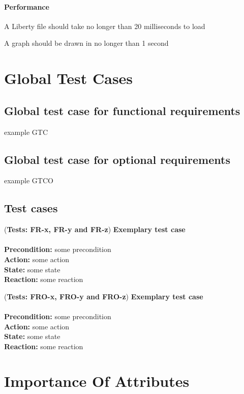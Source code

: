 \documentclass[10pt,a4paper]{report}
\newcommand{\precondition}[1]{
    \textbf{Precondition: } #1 \leavevmode \\
}
\newcommand{\action}[1]{
    \textbf{Action: } #1 \leavevmode \\
}
\newcommand{\state}[1]{
    \textbf{State: } #1 \leavevmode \\
}
\newcommand{\reaction}[1]{
    \textbf{Reaction: } #1 \leavevmode \\
}
\newcommand{\GTCDescription}[2]{
    (\textbf{Tests: #1}) \textbf{#2} \leavevmode \\
}
\newcommand{\GTCODescription}[2]{
    (\textbf{Tests: #1}) \textbf{#2} \leavevmode \\
}
\begin{document}
\subsubsection{Performance}
\begin{NFRO-Perf}
    \item A Liberty file should take no longer than 20 milliseconds to load
    \item A graph should be drawn in no longer than 1 second
\end{NFRO-Perf}

\chapter{Global Test Cases}

\section{Global test case for functional requirements}
\begin{GTC}
    \item example GTC
\end{GTC}

\section{Global test case for optional requirements}
\begin{GTCO}
    \item example GTCO
\end{GTCO}

\section{Test cases}
\begin{GTC}
    \item \GTCDescription{FR-x, FR-y and FR-z}{Exemplary test case} \leavevmode \\ \precondition{some precondition}\action{some action}\state{some state}\reaction{some reaction}
\end{GTC}
\begin{GTCO}
    \item \GTCODescription{FRO-x, FRO-y and FRO-z}{Exemplary test case} \leavevmode \\ \precondition{some precondition}\action{some action}\state{some state}\reaction{some reaction}
\end{GTCO}

\chapter{Importance Of Attributes}
\end{document}
